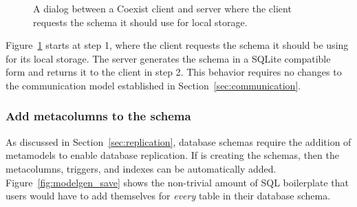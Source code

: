 \begin{figure}[h!]
\centering
{}
\caption{A dialog between a Coexist client and server where the client requests
the schema it should use for local storage.}
\label{fig:modelgen_flow}
\end{figure}

Figure~\ref{fig:modelgen_flow} starts at step 1, where the client requests the
schema it should be using for its local storage. The server generates the
schema in a SQLite compatible form and returns it to the client in step 2. This
behavior requires no changes to the communication model established in
Section~\ref{sec:communication}.




\subsubsection{Add metacolumns to the schema} \label{sec:mm_advantage}

As discussed in Section~\ref{sec:replication}, database schemas require the
addition of metamodels to enable database replication. If  is creating
the schemas, then the metacolumns, triggers, and indexes can be automatically
added. Figure~\ref{fig:modelgen_save} shows the non-trivial amount of SQL
boilerplate that users would have to add themselves for \emph{every} table
in their database schema.


